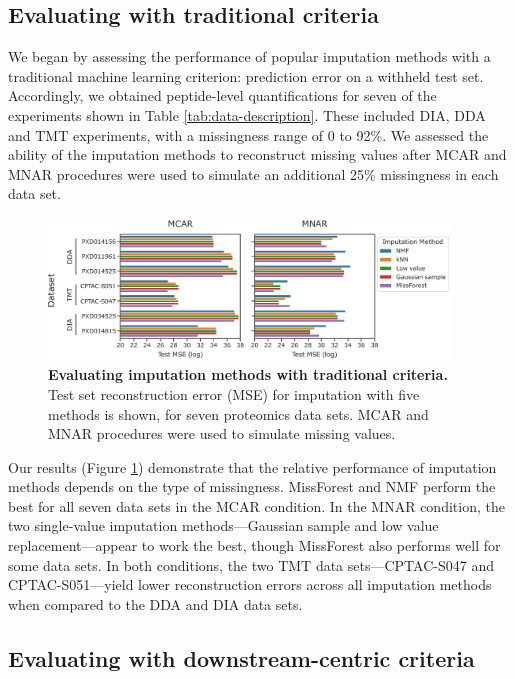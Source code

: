 \documentclass{article}
\begin{document}
\subsection{Evaluating with traditional criteria}

We began by assessing the performance of popular imputation methods with a traditional machine learning criterion: prediction error on a withheld test set. Accordingly, we obtained peptide-level quantifications for seven of the experiments shown in Table \ref{tab:data-description}. These included DIA, DDA and TMT experiments, with a missingness range of 0 to 92\%. We assessed the ability of the imputation methods to reconstruct missing values after MCAR and MNAR procedures were used to simulate an additional 25\% missingness in each data set.

\begin{figure}
  \centering
  \includegraphics[width=0.95\textwidth]{figures/traditional-evaluation-figure.pdf}
  \caption{{\bf Evaluating imputation methods with traditional criteria.} 
  Test set reconstruction error (MSE) for imputation with five methods is shown, for seven proteomics data sets. MCAR and MNAR procedures were used to simulate missing values.}
  \label{fig:traditional-eval}
\end{figure}

Our results (Figure \ref{fig:traditional-eval}) demonstrate that the relative performance of imputation methods depends on the type of missingness. MissForest and NMF perform the best for all seven data sets in the MCAR condition. In the MNAR condition, the two single-value imputation methods---Gaussian sample and low value replacement---appear to work the best, though MissForest also performs well for some data sets. In both conditions, the two TMT data sets---CPTAC-S047 and CPTAC-S051---yield lower reconstruction errors across all imputation methods when compared to the DDA and DIA data sets. 

\subsection{Evaluating with downstream-centric criteria}
\end{document}
